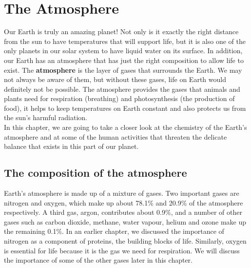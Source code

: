 \chapter{The Atmosphere}
\label{chap:atmosphere}

Our Earth is truly an amazing planet! Not only is it exactly the right distance from the sun to have temperatures that will support life, but it is also one of the only planets in our solar system to have liquid water on its surface. In addition, our Earth has an atmosphere that has just the right composition to allow life to exist. The \textbf{atmosphere} is the layer of gases that surrounds the Earth. We may not always be aware of them, but without these gases, life on Earth would definitely not be possible. The atmosphere provides the gases that animals and plants need for respiration (breathing) and photosynthesis (the production of food), it helps to keep temperatures on Earth constant and also protects us from the sun's harmful radiation. \\

In this chapter, we are going to take a closer look at the chemistry of the Earth's atmosphere and at some of the human activities that threaten the delicate balance that exists in this part of our planet.

\section{The composition of the atmosphere}
\label{sec:atmos:comp}

Earth's atmosphere is made up of a mixture of gases. Two important gases are nitrogen and oxygen, which make up about 78.1\% and 20.9\% of the atmosphere respectively. A third gas, argon, contributes about 0.9\%, and a number of other gases such as carbon dioxide, methane, water vapour, helium and ozone make up the remaining 0.1\%. In an earlier chapter, we discussed the importance of nitrogen as a component of proteins, the building blocks of life. Similarly, oxygen is essential for life because it is the gas we need for respiration. We will discuss the importance of some of the other gases later in this chapter.

